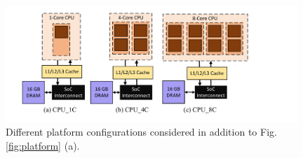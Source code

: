 \begin{figure}[ht]
    \centering
    \includegraphics[width= 0.98\textwidth]{figs/mappings.pdf}
    \caption{{Different platform configurations considered in addition to Fig. \ref{fig:platform} (a).}}
    \label{fig:map_2}
\end{figure}

